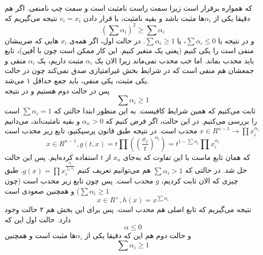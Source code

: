 \begin{enumerate}
که همواره برقرار است زیرا سمت راست نامثبت است و سمت چپ نامنفی.
اگر هم دقیقا یکی از 
$\alpha_i$‌ها
مثبت باشد و بقیه نامثبت، با قرار دادن 
$v_i=x_i$
نتیجه می‌گیریم که 
\[
(\sum \alpha_i)^2 \ge \sum \alpha_i
\]
و در نتیجه یا 
$\sum \alpha_i \le 0$،
یا 
$\sum \alpha_i \ge 1$.
در حالت اول، اگر همه‌ی
$x_i$
‌هایی که ضریبشان منفی است را یکی کنیم (یعنی یک متغیر کنیم. این کار ممکن است چون  با آفین)،
تابع باید محدب بماند. اما خب محدب نمی‌ماند زیرا الان یک 
$\alpha_i$
مثبت داریم، یک 
$\alpha_i$
منفی و جمعشان هم منفی است که در شرایط بخش غیرامتیازی صدق نمی‌کند چون در حالت یکی مثبت، یکی منفی، باید جمع حداقل ۱ می‌شد.\\
پس در حالت دوم هستیم و در نتیجه 
\[
\sum \alpha_i \ge 1
\]
ثابت می‌کنیم که همین شرایط کافیست. به این منظور ابتدا حالتی که 
$\sum \alpha_i = 1$
است را بررسی می‌کنیم. در این حالت، اگر فرض کنیم که 
$\alpha_n > 0$
و بقیه‌ نامثبت‌اند، می‌دانیم
$x \in R^{n - 1} \to \prod x_i^{\alpha_i}$
محدب است. در نتیجه طبق قانون پرسپکتیو، تابع زیر محدب است
\[
x \in R^{n - 1}, g(t, x) = t\prod((\frac{x_i}{t})^{\alpha_i}) = t^{1 - \sum \alpha_i} \prod x_i^{\alpha_i}
\]
که همان تابع ماست با این تفاوت که به‌جای
$x_n$
از $t$ استفاده کرده‌ایم. پس این حالت حل شد. در حالتی که 
$\sum \alpha_i > 1$
هم می‌توانیم تعریف کنیم
$g(x) = \prod x_i^{\frac{\alpha_i}{\sum \alpha_i}}$.
طبق چیزی که الان ثابت کردیم، 
$g$ محدب است.
پس چون تابع زیر محدب است (چون $\sum \alpha_i \ge 1$) و همچنین صعودی است
\[
x \in R^+, h(x) = x^{\sum \alpha_i}
\]
نتیجه می‌گیریم که تابع اصلی هم محدب است. پس برای این بخش هم ۲ حالت وجود دارد.
حالت اول این که 
\[
\alpha \le 0
\]
و حالت دوم هم این که دقیقا یکی از $\alpha_i$‌ها مثبت است و همچنین
\[
\sum \alpha_i \ge 1
\]
\end{enumerate}